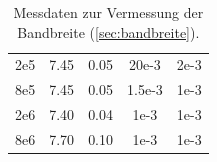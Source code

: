 \documentclass[sn-mathphys-num,iicol]{sn-jnl}
\theoremstyle{thmstyleone}
\theoremstyle{thmstyletwo}
\theoremstyle{thmstylethree}
\begin{document}
\begin{table}[h]
\begin{tabular}{S[table-format=1.2e1] S[table-format=1.2] S[table-format=1.2] S[table-format=1.2e1] S[table-format=1.2e1]}
		2e5                    & 7.45                    & 0.05                           & 20e-3                 & 2e-3                         \\
		8e5                    & 7.45                    & 0.05                           & 1.5e-3                & 1e-3                         \\
		2e6                    & 7.40                    & 0.04                           & 1e-3                  & 1e-3                         \\
		8e6                    & 7.70                    & 0.10                           & 1e-3                  & 1e-3                         \\
		\bottomrule
	\end{tabular}
	\caption{Messdaten zur Vermessung der Bandbreite (\ref{sec:bandbreite}).}
	\label{tab:frequency_data}
\end{table}
\end{document}

